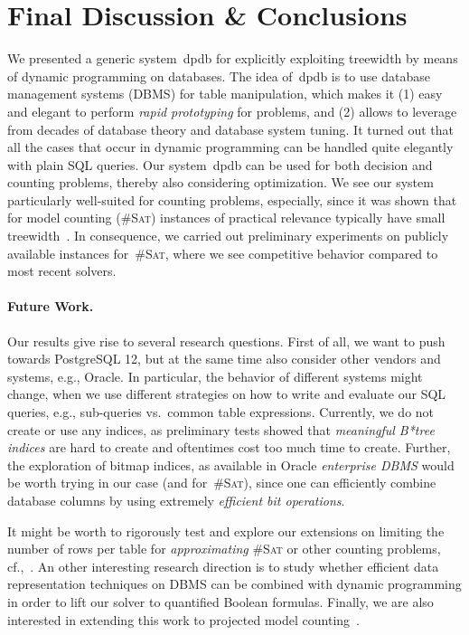 \documentclass{llncs}
\newcommand{\cSAT}{\textsc{\#Sat}\xspace}%
\newcommand{\dpdb}{{\small\textsf{dpdb}}\xspace}
\begin{document}
\section{Final Discussion \& Conclusions}
%
%
%
%
%
%
%
%
%
We presented a generic system~\dpdb for explicitly exploiting treewidth
by means of dynamic programming on databases.
The idea of~\dpdb is to use database management systems (DBMS)
for table manipulation, which makes it (1) easy and elegant to
perform \emph{rapid prototyping} for problems,
and (2) allows to leverage from decades of database theory and 
database system tuning.
%
It turned out that all the cases that occur in dynamic programming can be handled
quite elegantly with plain SQL queries.
%
Our system~\dpdb can be used for both decision and counting problems,
thereby also considering optimization.
We see our system particularly well-suited for counting problems,
especially, since it was shown that for model counting (\cSAT)
instances of practical relevance typically have small treewidth~\cite{FichteHecherZisser19}.
%
%
In consequence, we carried out preliminary experiments on publicly available instances for~\cSAT, 
where we see competitive behavior compared to most recent solvers.
%
%

\paragraph{Future Work.}
Our results give rise to several research questions.
%
First of all, we want to push towards PostgreSQL 12, but at the same time
also consider other vendors and systems, e.g., Oracle.
In particular, the behavior of different systems might change,
when we use different strategies on how to write and evaluate our SQL queries, 
e.g., sub-queries vs.\ common table expressions.
%
Currently, we do not create or use any indices,
as preliminary tests showed that \emph{meaningful B*tree indices} are hard to create
and oftentimes cost too much time to create. %
%
Further, the exploration of bitmap indices, as available in Oracle \emph{enterprise DBMS} would be worth trying in our case (and for~\cSAT), 
since one can efficiently combine database columns by 
using extremely \emph{efficient bit operations}.
%

It might be worth to rigorously test and explore our extensions on limiting the number of rows per table for \emph{approximating} \cSAT or other counting problems, cf.,~\cite{ChakrabortyMeelVardi16a,MeelEtAl17a}.
%
%
An other interesting research direction is to study whether
efficient data representation techniques on DBMS can be combined with dynamic
programming in order to lift our solver to quantified Boolean formulas.
%
%
Finally, we are also interested in extending this work to projected
model counting~\cite{FichteEtAl18d}.
%
%
%

%


%
\end{document}
